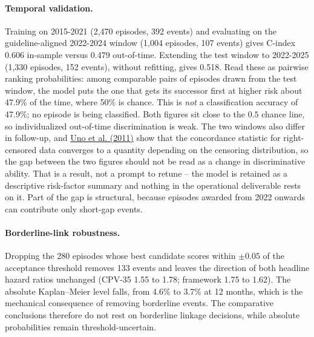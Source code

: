 \documentclass[11pt,a4paper]{article}
\begin{document}
\paragraph{Temporal validation.} Training on
2015-2021 (2,470 episodes,
392 events) and evaluating on the guideline-aligned
2022-2024 window (1,004 episodes,
107 events) gives C-index
0.606 in-sample versus
0.479 out-of-time. Extending the test window to
2022-2025 (1,330 episodes,
152 events), without refitting, gives
0.518. Read these as pairwise ranking probabilities:
among comparable pairs of episodes drawn from the test window, the model puts
the one that gets its successor first at higher risk about
47.9\% of the time, where 50\% is chance. This is
\emph{not} a classification accuracy of
47.9\%; no episode is being classified. Both
figures sit close to the \(0.5\) chance line, so individualized out-of-time
discrimination is weak. The two windows also differ in
follow-up, and \href{https://doi.org/10.1002/sim.4154}{Uno et al. (2011)} show
that the concordance statistic for right-censored data converges to a quantity
depending on the censoring distribution, so the gap between the two figures should
not be read as a change in discriminative ability. That is a result, not a
prompt to retune -- the model is retained as a descriptive risk-factor summary
and nothing in the operational deliverable rests on it. Part of the gap is
structural, because episodes awarded from 2022 onwards can contribute only
short-gap events.

\paragraph{Borderline-link robustness.} Dropping the
280 episodes whose best candidate scores within
\(\pm0.05\) of the acceptance threshold removes
133 events and leaves the direction of both headline
hazard ratios unchanged (CPV-35 1.55 to
1.78; framework
1.75 to
1.62). The absolute
Kaplan--Meier level falls, from
4.6\% to
3.7\% at 12 months,
which is the mechanical consequence of removing borderline events. The
comparative conclusions therefore do not rest on borderline linkage decisions,
while absolute probabilities remain threshold-uncertain.
\end{document}
